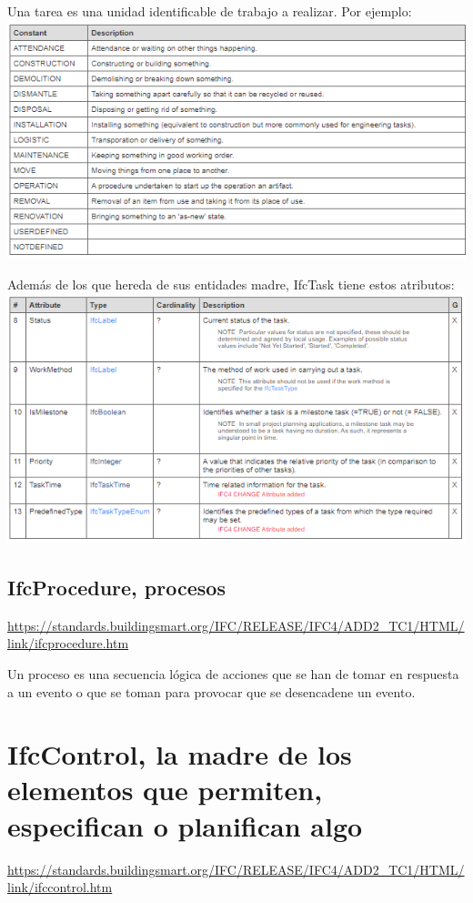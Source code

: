\documentclass[spanish,12pt,a4paper,final,oneside]{book}
\begin{document}
Una tarea es una unidad identificable de trabajo a realizar. Por ejemplo:
\\ \includegraphics[width=\textwidth]{Definicion de IfcTaskTypeEnum}

Además de los que hereda de sus entidades madre, IfcTask tiene estos atributos:
\\ \includegraphics[width=\textwidth]{atributos de IfcTask}

\subsection{IfcProcedure, procesos}
\url{https://standards.buildingsmart.org/IFC/RELEASE/IFC4/ADD2_TC1/HTML/link/ifcprocedure.htm}

Un proceso es una secuencia lógica de acciones que se han de tomar en respuesta a un evento o que se toman para provocar que se desencadene un evento.


\section{IfcControl, la madre de los elementos que permiten, especifican o planifican algo}
\url{https://standards.buildingsmart.org/IFC/RELEASE/IFC4/ADD2_TC1/HTML/link/ifccontrol.htm}
\end{document}
